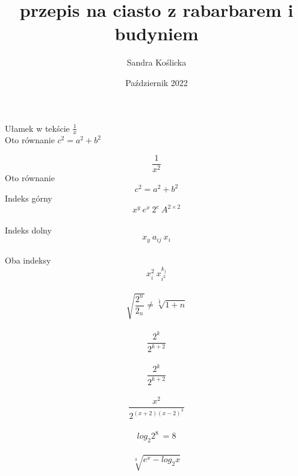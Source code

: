 \documentclass[12pt, letterpaper, titlepage]{article}
\title{przepis na ciasto z rabarbarem i budyniem}
\author{Sandra Koślicka}
\date{Październik 2022}
\begin{document}
\maketitle

Ułamek w tekście $ \frac{1}{x} $\\
Oto równanie $ c^{2}=a^{2}+b^{2} $

\begin{equation}
\frac{1}{x^2}
\end{equation}
Oto równanie
\begin{equation}
c^{2}=a^{2}+b^{2}
\end{equation}
Indeks górny $$ x^{y} \ e^{x} \ 2^{e} \ A^{2 \times2} $$\\
Indeks dolny $$ x_y \ a_{ij} \ x_i $$\\
Oba indeksy $$ x_i^{2} \ x_{i^2}^{k_j}$$\\

$$\sqrt{ \frac{2^{n}}{2_n}} \neq \sqrt[\frac{1}{3}]{1+n} $$\\
$$\frac{2^{k}}{2^{k+2}} $$\\

$$\frac{2^{k}}{2^{k+2}} $$\\

$$\frac{x^2}{2^{(x+2)(x-2)^{3}}} $$\\

$$ log_2 2^8 \ =8 $$\\
$$\sqrt[3]{e^x-log_2 x}$$\\
\end{document}
